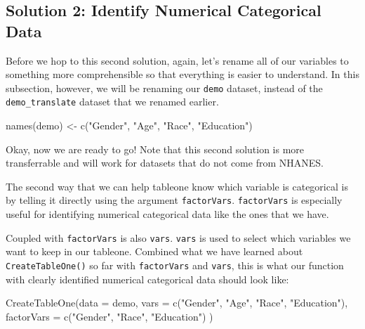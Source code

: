 \documentclass[
]{book}
\newenvironment{Shaded}{\begin{snugshade}}{\end{snugshade}}
\newcommand{\AttributeTok}[1]{\textcolor[rgb]{0.77,0.63,0.00}{#1}}
\newcommand{\FunctionTok}[1]{\textcolor[rgb]{0.00,0.00,0.00}{#1}}
\newcommand{\NormalTok}[1]{#1}
\newcommand{\OtherTok}[1]{\textcolor[rgb]{0.56,0.35,0.01}{#1}}
\newcommand{\StringTok}[1]{\textcolor[rgb]{0.31,0.60,0.02}{#1}}
\begin{document}
\hypertarget{solution-2-identify-numerical-categorical-data}{%
\subsection{Solution 2: Identify Numerical Categorical Data}\label{solution-2-identify-numerical-categorical-data}}

Before we hop to this second solution, again, let's rename all of our variables to something more comprehensible so that everything is easier to understand. In this subsection, however, we will be renaming our \texttt{demo} dataset, instead of the \texttt{demo\_translate} dataset that we renamed earlier.

\begin{Shaded}
\begin{Highlighting}[]
\FunctionTok{names}\NormalTok{(demo) }\OtherTok{\textless{}{-}} \FunctionTok{c}\NormalTok{(}\StringTok{"Gender"}\NormalTok{, }\StringTok{"Age"}\NormalTok{, }\StringTok{"Race"}\NormalTok{, }\StringTok{"Education"}\NormalTok{)}
\end{Highlighting}
\end{Shaded}

Okay, now we are ready to go! Note that this second solution is more transferrable and will work for datasets that do not come from NHANES.

The second way that we can help tableone know which variable is categorical is by telling it directly using the argument \texttt{factorVars}. \texttt{factorVars} is especially useful for identifying numerical categorical data like the ones that we have.

Coupled with \texttt{factorVars} is also \texttt{vars}. \texttt{vars} is used to select which variables we want to keep in our tableone. Combined what we have learned about \texttt{CreateTableOne()} so far with \texttt{factorVars} and \texttt{vars}, this is what our function with clearly identified numerical categorical data should look like:

\begin{Shaded}
\begin{Highlighting}[]
\FunctionTok{CreateTableOne}\NormalTok{(}\AttributeTok{data =}\NormalTok{ demo,}
               \AttributeTok{vars =} \FunctionTok{c}\NormalTok{(}\StringTok{"Gender"}\NormalTok{, }\StringTok{"Age"}\NormalTok{, }\StringTok{"Race"}\NormalTok{, }\StringTok{"Education"}\NormalTok{),}
               \AttributeTok{factorVars =} \FunctionTok{c}\NormalTok{(}\StringTok{"Gender"}\NormalTok{, }\StringTok{"Race"}\NormalTok{, }\StringTok{"Education"}\NormalTok{)}
\NormalTok{              )}
\end{Highlighting}
\end{Shaded}
\end{document}
